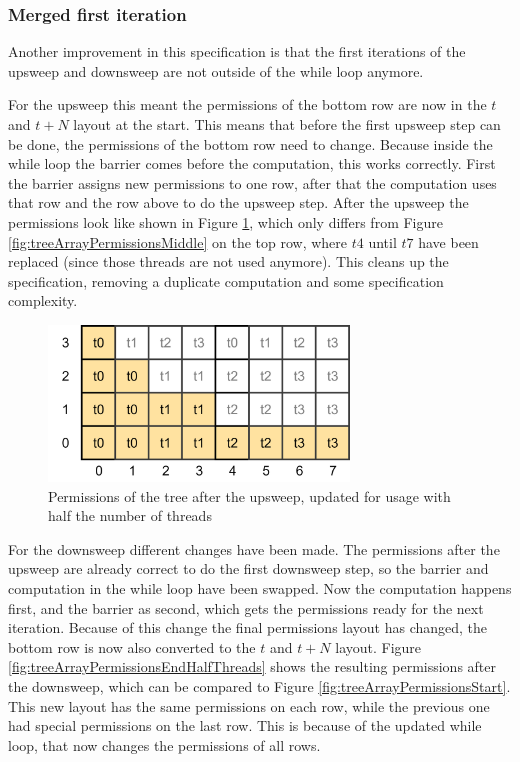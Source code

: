\documentclass[a4paper]{article}
\begin{document}
\subsubsection{Merged first iteration}
Another improvement in this specification is that the first iterations of the upsweep and downsweep are not outside of the while loop anymore.

For the upsweep this meant the permissions of the bottom row are now in the $t$ and $t+N$ layout at the start. This means that before the first upsweep step can be done, the permissions of the bottom row need to change. Because inside the while loop the barrier comes before the computation, this works correctly. First the barrier assigns new permissions to one row, after that the computation uses that row and the row above to do the upsweep step. After the upsweep the permissions look like shown in Figure \ref{fig:treeArrayPermissionsMiddleHalfThreads}, which only differs from Figure \ref{fig:treeArrayPermissionsMiddle} on the top row, where $t4$ until $t7$ have been replaced (since those threads are not used anymore). This cleans up the specification, removing a duplicate computation and some specification complexity.

\begin{figure}[htb!]
	\centering
	\includegraphics[width=80mm]{../images/tree-permissions-middle-halfthreads-v1.png}
	\caption{Permissions of the tree after the upsweep, updated for usage with half the number of threads}
	\label{fig:treeArrayPermissionsMiddleHalfThreads}
\end{figure}
\FloatBarrier

For the downsweep different changes have been made. The permissions after the upsweep are already correct to do the first downsweep step, so the barrier and computation in the while loop have been swapped. Now the computation happens first, and the barrier as second, which gets the permissions ready for the next iteration. Because of this change the final permissions layout has changed, the bottom row is now also converted to the $t$ and $t+N$ layout. Figure \ref{fig:treeArrayPermissionsEndHalfThreads} shows the resulting permissions after the downsweep, which can be compared to Figure \ref{fig:treeArrayPermissionsStart}. This new layout has the same permissions on each row, while the previous one had special permissions on the last row. This is because of the updated while loop, that now changes the permissions of all rows.
\end{document}
